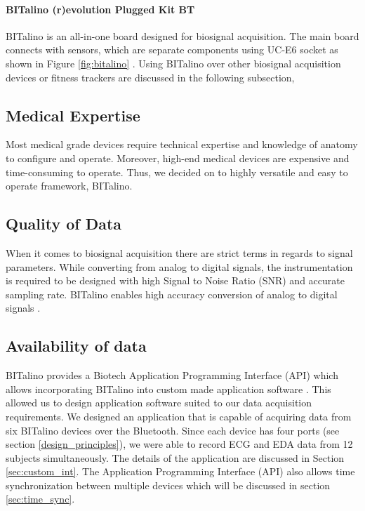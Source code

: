 \paragraph{BITalino (r)evolution Plugged Kit BT} BITalino is an all-in-one board designed for biosignal acquisition. The main board connects with sensors, which are separate components using UC-E6 socket as shown in Figure \ref{fig:bitalino} \cite{bitalino_datasheet}. Using BITalino over other biosignal acquisition devices or fitness trackers are discussed in the following subsection,

\subsection{Medical Expertise} Most medical grade devices require technical expertise and knowledge of anatomy to configure and operate. Moreover, high-end medical devices are expensive and time-consuming to operate. Thus, we decided on to highly versatile and easy to operate framework, BITalino.

\subsection{Quality of Data} When it comes to biosignal acquisition there are strict terms in regards to signal parameters. While converting from analog to digital signals, the instrumentation is required to be designed with high Signal to Noise Ratio (SNR) and accurate sampling rate. BITalino enables high accuracy conversion of analog to digital signals \cite{guerreiro_performance_2014}.

\subsection{Availability of data} BITalino provides a Biotech Application Programming Interface (API) which allows incorporating BITalino into custom made application software \cite{noauthor_biotech_nodate}. This allowed us to design application software suited to our data acquisition requirements. We designed an application that is capable of acquiring data from six BITalino devices over the Bluetooth. Since each device has four ports (see section \ref{design_principles}), we were able to record ECG and EDA data from 12 subjects simultaneously. The details of the application are discussed in Section \ref{sec:custom_int}. The Application Programming Interface (API) also allows time synchronization between multiple devices which will be discussed in section \ref{sec:time_sync}.

